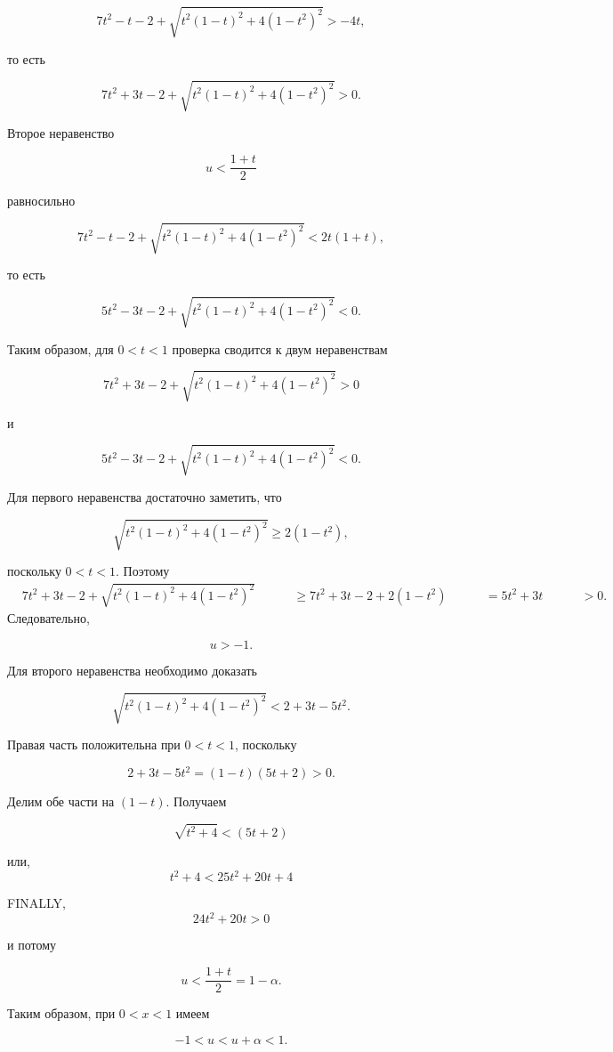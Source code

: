 \documentclass[12pt,a4paper]{article}
\begin{document}
	$$
	7t^2-t-2+
	\sqrt{
		t^2(1-t)^2+4(1-t^2)^2
	}
	>-4t,
	$$
	
	то есть
	
	$$
	7t^2+3t-2+
	\sqrt{
		t^2(1-t)^2+4(1-t^2)^2
	}>0.
	$$
	
	Второе неравенство
	
	$$
	u<\frac{1+t}{2}
	$$
	
	равносильно
	
	$$
	7t^2-t-2+
	\sqrt{
		t^2(1-t)^2+4(1-t^2)^2
	}
	<
	2t(1+t),
	$$
	
	то есть
	
	$$
	5t^2-3t-2+
	\sqrt{
		t^2(1-t)^2+4(1-t^2)^2
	}
	<0.
	$$
	
	Таким образом, для $0<t<1$ проверка сводится к двум неравенствам
	
	$$
	\boxed{
		7t^2+3t-2+
		\sqrt{
			t^2(1-t)^2+4(1-t^2)^2
		}>0
	}
	$$
	
	и
	
	$$
	\boxed{
		5t^2-3t-2+
		\sqrt{
			t^2(1-t)^2+4(1-t^2)^2
		}<0.
	}
	$$
	
	Для первого неравенства достаточно заметить, что
	
	$$
	\sqrt{
		t^2(1-t)^2+4(1-t^2)^2
	}
	\geq
	2(1-t^2),
	$$
	
	поскольку $0<t<1$. Поэтому
	\begin{align*}
		&7t^2+3t-2+
		\sqrt{
			t^2(1-t)^2+4(1-t^2)^2
		}\
		&\qquad\geq
		7t^2+3t-2+2(1-t^2)\
		&\qquad=
		5t^2+3t\
		&\qquad>0.
	\end{align*}
	Следовательно,
	
	$$
	u>-1.
	$$
	
	Для второго неравенства необходимо доказать
	
	$$
	\sqrt{
		t^2(1-t)^2+4(1-t^2)^2
	}
	<
	2+3t-5t^2.
	$$
	
	Правая часть положительна при $0<t<1$, поскольку
	
	$$
	2+3t-5t^2
	=
	(1-t)(5t+2)>0.
	$$
	
	Делим обе части на $(1-t)$. Получаем
	
	\[
	\sqrt{t^2+4} < (5t+2)
	\]
	
	или,
	\[
		t^2 + 4 < 25t^2 + 20t + 4
	\]
	
	FINALLY,
	\[
	24t^2 + 20t > 0 
	\]
	
	и потому
	
	$$
	u<\frac{1+t}{2}=1-\alpha.
	$$
	
	Таким образом, при $0<x<1$ имеем
	
	$$
	\boxed{
		-1<u<u+\alpha<1.
	}
	$$
	
\end{document}
